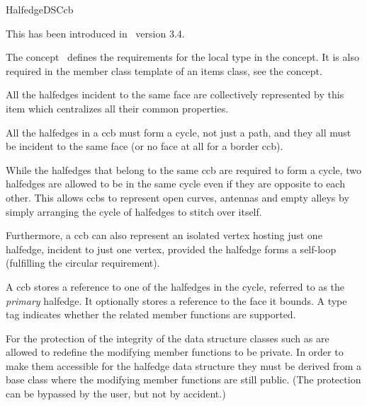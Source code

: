 
\ccRefPageBegin



\begin{ccRefConcept}{HalfedgeDSCcb}
\label{pageHalfedgeDSItemsCcbRef}

This has been introduced in  \cgal\ version 3.4.

\ccDefinition
  
The concept \ccRefName\ defines the requirements for the local  
type in the  concept. It is also required in 
the  member class template of an
items class, see the  concept.

All the halfedges incident to the same face are collectively represented
by this   item which centralizes all their common properties.

All the halfedges in a ccb must form a cycle, not just a path, and they all must be incident
to the same face (or no face at all for a border ccb).

While the halfedges that belong to the same ccb are required to form a cycle, 
two halfedges are allowed to be in the same cycle even if they are opposite to each other. 
This allows ccbs to represent open curves, antennas and empty alleys by simply arranging 
the cycle of halfedges to stitch over itself. 

Furthermore, a ccb can also represent an isolated vertex hosting just one halfedge,
incident to just one vertex, provided the halfedge forms a self-loop 
(fulfilling the circular requirement). 

A ccb stores a reference to one of the halfedges in the cycle,
referred to as the {\em primary} halfedge. It optionally stores 
a reference to the face it bounds. A type tag indicates whether 
the related member functions are supported. 

For the protection of the integrity of the data structure classes such as
 are allowed to redefine the modifying member 
functions to be private. In order to make them accessible for the 
halfedge data structure they must be derived from a base class 
where the modifying member functions are still public. (The protection
can be bypassed by the user, but not by accident.)


\end{ccRefConcept}
